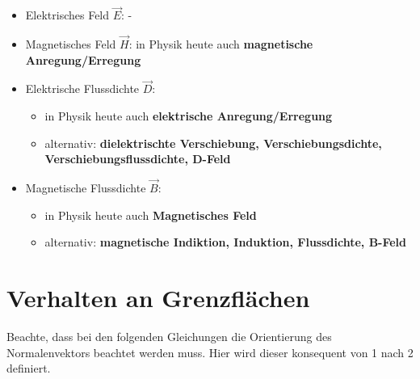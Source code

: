   \begin{itemize}
	  \item Elektrisches Feld $\vec{E}$: -

	  \item Magnetisches Feld $\vec{H}$: in Physik heute auch \textbf{magnetische
		        Anregung/Erregung}

	  \item Elektrische Flussdichte $\vec{D}$:
	        \begin{itemize}
		        \item in Physik heute auch \textbf{elektrische Anregung/Erregung}

		        \item alternativ: \textbf{dielektrischte Verschiebung, Verschiebungsdichte,
			              Verschiebungsflussdichte, D-Feld}
	        \end{itemize}

	  \item Magnetische Flussdichte $\vec{B}$:
	        \begin{itemize}
		        \item in Physik heute auch \textbf{Magnetisches Feld}

		        \item alternativ: \textbf{magnetische Indiktion, Induktion, Flussdichte,
			              B-Feld}
	        \end{itemize}
  \end{itemize}
 \section{Verhalten an Grenzflächen}\label{Grenz}
 Beachte, dass bei den folgenden Gleichungen die Orientierung des Normalenvektors beachtet werden muss. Hier wird dieser konsequent von 1 nach 2 definiert.
